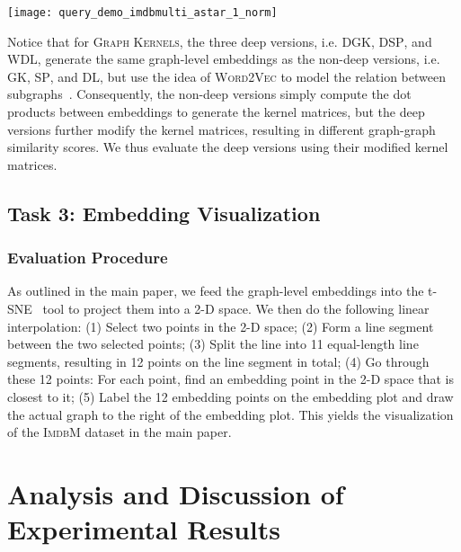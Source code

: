 \documentclass{article}
\newcommand{\model}{\textsc{UGraphEmb}\xspace}
\newcommand{\gk}{\textsc{Graph Kernels}\xspace}
\newcommand{\wv}{\textsc{Word2Vec}\xspace}
\newcommand{\imdb}{\textsc{ImdbM}\xspace}
\begin{document}
\begin{figure*}
\centering
\texttt{[image: query\_demo\_imdbmulti\_astar\_1\_norm]}
\caption{Visualization of the ranking results on a query in \imdb. The top row depicts the ground-truth ranking, labeled with normalized ground-truth GEDs, and the bottom row depicts ranking by \model, depicts the distance score computed by \model.}
\label{fig:query_imdb_vis}
\vspace*{-2mm}
\end{figure*}

Notice that for \gk, the three deep versions, i.e. \textsc{DGK}, \textsc{DSP}, and \textsc{WDL}, generate the same graph-level embeddings as the non-deep versions, i.e. \textsc{GK}, \textsc{SP}, and \textsc{DL}, but use the idea of \wv to model the relation between subgraphs~\cite{yanardag2015deep}. Consequently, the non-deep versions simply compute the dot products between embeddings to generate the kernel matrices, but the deep versions further modify the kernel matrices, resulting in different graph-graph similarity scores. We thus evaluate the deep versions using their modified kernel matrices.

\subsection{Task 3: Embedding Visualization}


\subsubsection{Evaluation Procedure}

As outlined in the main paper, we feed the graph-level embeddings into the t-SNE~\cite{maaten2008visualizing} tool to project them into a 2-D space. We then do the following linear interpolation: (1) Select two points in the 2-D space; (2) Form a line segment between the two selected points; (3) Split the line into 11 equal-length line segments, resulting in 12 points on the line segment in total; (4) Go through these 12 points: For each point, find an embedding point in the 2-D space that is closest to it; (5) Label the 12 embedding points on the embedding plot and draw the actual graph to the right of the embedding plot. This yields the visualization of the \imdb dataset in the main paper.
 \section{Analysis and Discussion of Experimental Results}
\label{sec-analysis}
\end{document}
